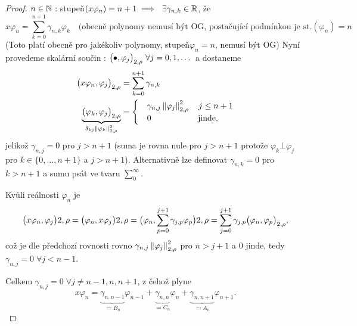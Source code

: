 \begin{proof}
    $n \in \mathbb{N}$ : stupeň$(x \varphi_n) = n+1 \implies ~ \exists \gamma_{n,k} \in \mathbb{R}$, že
   $$
        x \varphi_n = \sum_{k=0}^{n+1} \gamma_{n,k} \varphi_k \quad (\text{obecně polynomy nemusí být OG, postačující podmínkou je st.}(\varphi_n)=n
   $$
    (Toto platí obecně pro jakékoliv polynomy, stupeň$ \varphi_n = n$, nemusí být OG)
    Nyní provedeme skalární součin : $\big( \bullet, \varphi_j \big)_{2,\rho} ~ \forall j=0,1,\dots$ a dostaneme
    \begin{align}
        \big( x \varphi_n, \varphi_j \big)_{2, \rho} &= \sum_{k=0}^{n+1} \gamma_{n,k}\\ \underbrace{\big( \varphi_k, \varphi_j \big)_{2,\rho}}_{\delta_{kj}\left\lVert\varphi_k\right\rVert_{2,\rho}^2} &= \begin{cases}
        &\gamma_{n,j} \left\lVert\varphi_j\right\rVert^2_{2,\rho} \quad j\leq n+1\\
        &0 \qquad\qquad\quad\;\text{ jinde},
        \end{cases}
    \end{align}
    jelikož $\gamma_{n,j} = 0$ pro $j > n+1$ (suma je rovna nule pro $j>n+1$ protože $\varphi_k \bot \varphi_j$ pro $k \in \{0, \dots, n+1\}$ a $j > n+1$). Alternativně lze definovat $\gamma_{n,k} = 0$ pro $k>n+1$ a sumu psát ve tvaru $\sum_0^\infty$.

Kvůli reálnosti $\varphi_n$ je
$$\big( x\varphi_n, \varphi_j \big){2,\rho} = \big( \varphi_n, x\varphi_j \big){2,\rho} = \big( \varphi_n, \sum\limits_{p=0}^{j+1}\gamma_{j,p}\varphi_p \big){2,\rho} = \sum\limits_{j=0}^{j+1}\gamma_{j,p}\big( \varphi_n, \varphi_p \big)_{2,\rho},
$$
což je dle předchozí rovnosti rovno $\gamma_{n,j}\left\lVert\varphi_j\right\rVert_{2,\rho}^2$ pro $n>j+1$ a $0$ jinde, tedy $\gamma_{n,j}=0\;\forall j<n-1$.

Celkem $\gamma_{n,j}=0\;\forall j\neq n-1,n,n+1$, z čehož plyne 
$$x\varphi_n = \underbrace{\gamma_{n,n-1}}_{\eqqcolon B_n}\varphi_{n-1} + \underbrace{\gamma_{n,n}}_{\eqqcolon C_n}\varphi_n + \underbrace{\gamma_{n,n+1}}_{\eqqcolon A_n}\varphi_{n+1}.$$

\end{proof}


